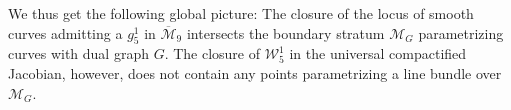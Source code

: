 \documentclass[11pt]{amsart}
\begin{document}
We thus get the following global picture: The closure of the locus of smooth curves admitting a $g_5^1$ in $\overline {\mathcal M}_9$ intersects the boundary stratum $\mathcal M_G$ parametrizing curves with dual graph $G$. The closure of $\mathcal W_5^1$ in the universal compactified Jacobian, however, does not contain any points parametrizing a line bundle over $\mathcal M_G$. 



\end{document}
